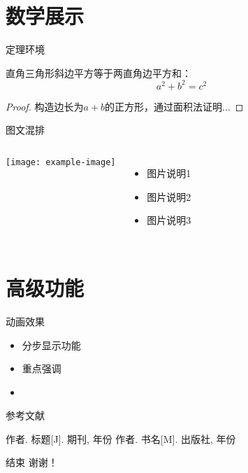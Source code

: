 \documentclass[aspectratio=169]{beamer}
\begin{document}
\section{数学展示}
\begin{frame}{定理环境}
    \begin{theorem}[勾股定理]
        直角三角形斜边平方等于两直角边平方和：
        $$ a^2 + b^2 = c^2 $$
    \end{theorem}

    \begin{proof}
        构造边长为$a+b$的正方形，通过面积法证明...
    \end{proof}
\end{frame}

\begin{frame}{图文混排}
    \begin{columns}
        \texttt{[image: example-image]} %
        \begin{itemize}
            \item 图片说明1
            \item 图片说明2
            \item 图片说明3
        \end{itemize}
    \end{columns}
\end{frame}

\section{高级功能}
\begin{frame}{动画效果}
    \begin{itemize}
        \item 分步显示功能 \pause
        \item \alert<2>{重点强调} \pause
        \item {}
    \end{itemize}

\end{frame}

\begin{frame}{参考文献}
    \begin{thebibliography}{9}
         作者. 标题[J]. 期刊, 年份
         作者. 书名[M]. 出版社, 年份
    \end{thebibliography}
\end{frame}

\begin{frame}{结束}
    \centering
    \Huge 谢谢！
\end{frame}
\end{document}
